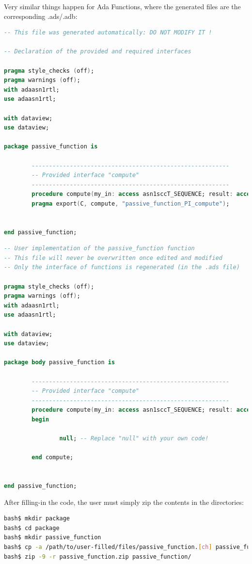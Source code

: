 \documentclass[11pt]{book}
\begin{document}
Very similar things happen for Ada Functions, where the generated files are the corresponding .ads/.adb:

\begin{lstlisting}[language=Ada]
-- This file was generated automatically: DO NOT MODIFY IT !

-- Declaration of the provided and required interfaces

pragma style_checks (off);
pragma warnings (off);
with adaasn1rtl;
use adaasn1rtl;

with dataview;
use dataview;

package passive_function is

        ---------------------------------------------------------
        -- Provided interface "compute"
        ---------------------------------------------------------
        procedure compute(my_in: access asn1sccT_SEQUENCE; result: access asn1sccT_INTEGER);
        pragma export(C, compute, "passive_function_PI_compute");


end passive_function;
\end{lstlisting}

\begin{lstlisting}[language=Ada]
-- User implementation of the passive_function function
-- This file will never be overwritten once edited and modified
-- Only the interface of functions is regenerated (in the .ads file)

pragma style_checks (off);
pragma warnings (off);
with adaasn1rtl;
use adaasn1rtl;

with dataview;
use dataview;

package body passive_function is

        ---------------------------------------------------------
        -- Provided interface "compute"
        ---------------------------------------------------------
        procedure compute(my_in: access asn1sccT_SEQUENCE; result: access asn1sccT_INTEGER) is
        begin

                null; -- Replace "null" with your own code!

        end compute;


end passive_function;
\end{lstlisting}

After filling-in the code, the user must simply zip the contents in the directories:

\begin{lstlisting}[language=bash]
bash$ mkdir package
bash$ cd package
bash$ mkdir passive_function
bash$ cp -a /path/to/user-filled/files/passive_function.[ch] passive_function/
bash$ zip -9 -r passive_function.zip passive_function/
\end{lstlisting}
\end{document}
